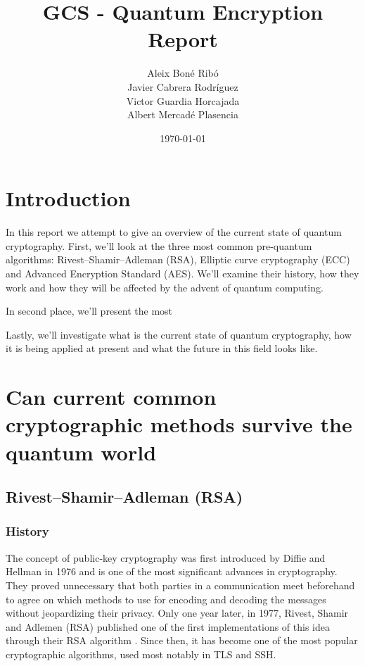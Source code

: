 
\usepackage{dsfont}






\title{
    GCS - Quantum Encryption Report
}
\author{
Aleix Boné Ribó\\
Javier Cabrera Rodríguez\\
Victor Guardia Horcajada\\
Albert Mercadé Plasencia
}
\date{
    \today
}





\tableofcontents

\setlength{\parskip}{1em}

\pagebreak
\section{Introduction}%
\label{sec:introduction}

In this report we attempt to give an overview of the current state of quantum
cryptography. First, we’ll look at the three most common pre-quantum algorithms:
Rivest–Shamir–Adleman (RSA), Elliptic curve cryptography (ECC) and Advanced
Encryption Standard (AES). We’ll examine their history, how they work and how
they will be affected by the advent of quantum computing.

In second place, we’ll present the most %

Lastly, we’ll investigate what is the current state of quantum cryptography, how
it is being applied at present and what the future in this field looks like.


\pagebreak
\section{Can current common cryptographic methods survive the quantum world}

\subsection{Rivest–Shamir–Adleman (RSA)}

\subsubsection{History}

The concept of public-key cryptography was first introduced by Diffie and
Hellman in 1976 and is one of the most significant advances in cryptography.
They proved unnecessary that both parties in a communication meet beforehand to
agree on which methods to use for encoding and decoding the messages without
jeopardizing their privacy. Only one year later, in 1977, Rivest, Shamir and
Adlemen (RSA) published one of the first implementations of this idea through
their RSA algorithm \cite{rivest_method_1978}. Since then, it has become one of the most popular
cryptographic algorithms, used most notably in TLS and SSH.

